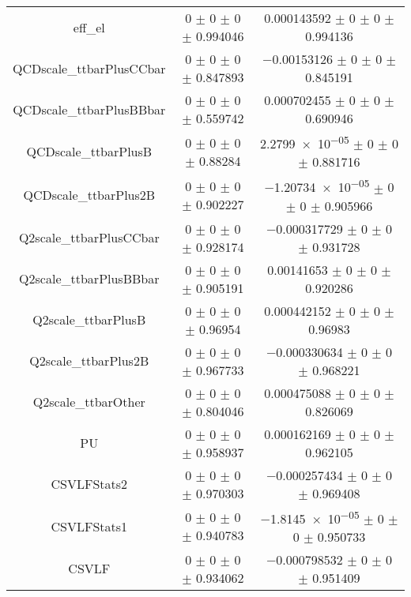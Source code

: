 \begin{table}
\begin{tabular}{ccc}
eff\_el & \num{0} $\pm$ \num{0} $\pm$ \num{0} $\pm$ \num{0.994046} & \num{0.000143592} $\pm$ \num{0} $\pm$ \num{0} $\pm$ \num{0.994136}\\
QCDscale\_ttbarPlusCCbar & \num{0} $\pm$ \num{0} $\pm$ \num{0} $\pm$ \num{0.847893} & \num{-0.00153126} $\pm$ \num{0} $\pm$ \num{0} $\pm$ \num{0.845191}\\
QCDscale\_ttbarPlusBBbar & \num{0} $\pm$ \num{0} $\pm$ \num{0} $\pm$ \num{0.559742} & \num{0.000702455} $\pm$ \num{0} $\pm$ \num{0} $\pm$ \num{0.690946}\\
QCDscale\_ttbarPlusB & \num{0} $\pm$ \num{0} $\pm$ \num{0} $\pm$ \num{0.88284} & \num{2.2799e-05} $\pm$ \num{0} $\pm$ \num{0} $\pm$ \num{0.881716}\\
QCDscale\_ttbarPlus2B & \num{0} $\pm$ \num{0} $\pm$ \num{0} $\pm$ \num{0.902227} & \num{-1.20734e-05} $\pm$ \num{0} $\pm$ \num{0} $\pm$ \num{0.905966}\\
Q2scale\_ttbarPlusCCbar & \num{0} $\pm$ \num{0} $\pm$ \num{0} $\pm$ \num{0.928174} & \num{-0.000317729} $\pm$ \num{0} $\pm$ \num{0} $\pm$ \num{0.931728}\\
Q2scale\_ttbarPlusBBbar & \num{0} $\pm$ \num{0} $\pm$ \num{0} $\pm$ \num{0.905191} & \num{0.00141653} $\pm$ \num{0} $\pm$ \num{0} $\pm$ \num{0.920286}\\
Q2scale\_ttbarPlusB & \num{0} $\pm$ \num{0} $\pm$ \num{0} $\pm$ \num{0.96954} & \num{0.000442152} $\pm$ \num{0} $\pm$ \num{0} $\pm$ \num{0.96983}\\
Q2scale\_ttbarPlus2B & \num{0} $\pm$ \num{0} $\pm$ \num{0} $\pm$ \num{0.967733} & \num{-0.000330634} $\pm$ \num{0} $\pm$ \num{0} $\pm$ \num{0.968221}\\
Q2scale\_ttbarOther & \num{0} $\pm$ \num{0} $\pm$ \num{0} $\pm$ \num{0.804046} & \num{0.000475088} $\pm$ \num{0} $\pm$ \num{0} $\pm$ \num{0.826069}\\
PU & \num{0} $\pm$ \num{0} $\pm$ \num{0} $\pm$ \num{0.958937} & \num{0.000162169} $\pm$ \num{0} $\pm$ \num{0} $\pm$ \num{0.962105}\\
CSVLFStats2 & \num{0} $\pm$ \num{0} $\pm$ \num{0} $\pm$ \num{0.970303} & \num{-0.000257434} $\pm$ \num{0} $\pm$ \num{0} $\pm$ \num{0.969408}\\
CSVLFStats1 & \num{0} $\pm$ \num{0} $\pm$ \num{0} $\pm$ \num{0.940783} & \num{-1.8145e-05} $\pm$ \num{0} $\pm$ \num{0} $\pm$ \num{0.950733}\\
CSVLF & \num{0} $\pm$ \num{0} $\pm$ \num{0} $\pm$ \num{0.934062} & \num{-0.000798532} $\pm$ \num{0} $\pm$ \num{0} $\pm$ \num{0.951409}\\

\end{tabular}
\end{table}
